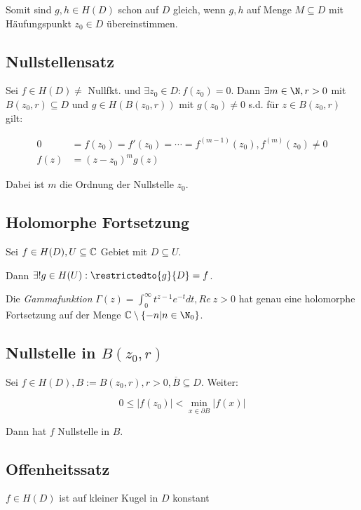Somit sind $g, h \in H(D)$ schon auf $D$ gleich, wenn $g, h$ auf Menge $M \subseteq D$ mit Häufungspunkt $z_0 \in D$ übereinstimmen.

\subsection*{Nullstellensatz}

Sei $f \in H(D) \neq$ Nullfkt. und $\exists z_0 \in D : f(z_0) = 0$. Dann $\exists m \in \N, r > 0$ mit $B(z_0, r) \subseteq D$ und $g \in H(B(z_0,r))$ mit $g(z_0) \neq 0$ s.d. für $z \in B(z_0,r)$ gilt:

\vspace{-4mm}
\begin{align*}
0 &= f(z_0) = f'(z_0) = \cdots = f^{(m-1)}(z_0), f^{(m)}(z_0) \neq 0 \\
f(z) &= (z-z_0)^m g(z)
\end{align*}

Dabei ist $m$ die Ordnung der Nullstelle $z_0$.

\subsection*{Holomorphe Fortsetzung}

Sei $f \in H(D), U \subseteq \mathbb{C}$ Gebiet mit $D \subseteq U$.

Dann $\exists! g \in H(U) : \restrictedto{g}{D} = f$.

\spacing

Die \emph{Gammafunktion} $\Gamma(z) = \int_0^\infty t^{z-1}e^{-t} dt, Re \ z > 0$ hat genau eine holomorphe Fortsetzung auf der Menge $\C \setminus \{ -n | n \in \N_0 \}$.

\subsection*{Nullstelle in $B(z_0,r)$}

Sei $f \in H(D), B := B(z_0,r), r > 0, \overline B \subseteq D$. Weiter:

\vspace*{-3mm}
$$0 \leq |f(z_0)| < \min_{x \in \partial B} |f(x)|$$

Dann hat $f$ Nullstelle in $B$.

\subsection*{Offenheitssatz}

$f \in H(D)$ ist auf kleiner Kugel in $D$ konstant

